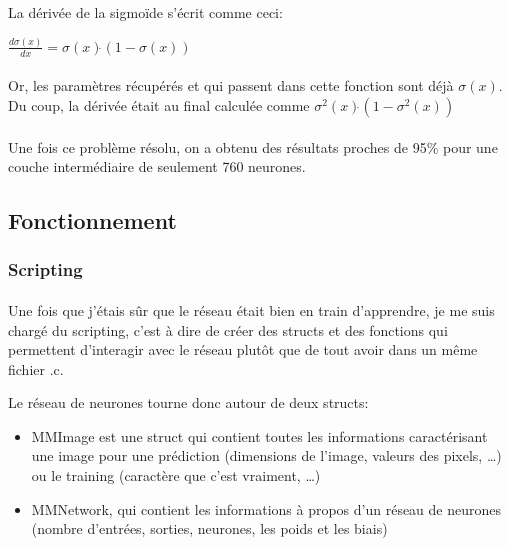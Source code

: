 \documentclass{article}
\begin{document}
La dérivée de la sigmoïde s'écrit comme ceci:

\begin{center}
	$\frac{d\sigma(x)}{dx} = \sigma(x)\dot{}(1 - \sigma(x))$
\end{center}

\paragraph{}Or, les paramètres récupérés et qui passent dans cette fonction sont déjà $\sigma(x)$. Du coup, la dérivée était au final calculée comme $\sigma^2(x)\dot{}(1 - \sigma^2(x))$

\paragraph{}Une fois ce problème résolu, on a obtenu des résultats proches de 95\% pour une couche intermédiaire de seulement 760 neurones.

\subsection{Fonctionnement}

\subsubsection{Scripting}

\paragraph{}Une fois que j'étais sûr que le réseau était bien en train d'apprendre, je me suis chargé du scripting, c'est à dire de créer des structs et des fonctions qui permettent d'interagir avec le réseau plutôt que de tout avoir dans un même fichier .c.

Le réseau de neurones tourne donc autour de deux structs: 

\begin{itemize}
	\item MMImage est une struct qui contient toutes les informations caractérisant une image pour une prédiction (dimensions de l'image, valeurs des pixels, …) ou le training (caractère que c'est vraiment, …)
	\item MMNetwork, qui contient les informations à propos d'un réseau de neurones (nombre d'entrées, sorties, neurones, les poids et les biais)
\end{itemize}
\end{document}
